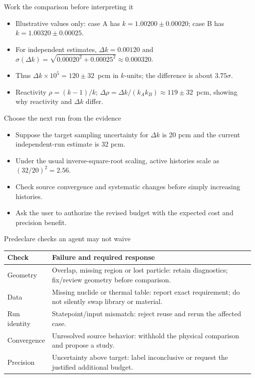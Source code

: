 \documentclass[aspectratio=169,11pt]{beamer}
\begin{document}
\begin{frame}[t,fragile]{Work the comparison before interpreting it}
\fontsize{11.5}{14}\selectfont
\begin{itemize}\setlength{\itemsep}{2mm}
\item Illustrative values only: case A has $k = 1.00200 \pm 0.00020$; case B has $k = 1.00320 \pm 0.00025$.
\item For independent estimates, $\Delta k = 0.00120$ and $\sigma(\Delta k) = \sqrt{0.00020^2 + 0.00025^2} \approx 0.000320$.
\item Thus $\Delta k \times 10^5 = 120 \pm 32$~pcm in $k$-units; the difference is about $3.75\sigma$.
\item Reactivity $\rho = (k-1)/k$; $\Delta \rho = \Delta k / (k_A k_B) \approx 119 \pm 32$~pcm, showing why reactivity and $\Delta k$ differ.
\end{itemize}
\end{frame}
\begin{frame}[t,fragile]{Choose the next run from the evidence}
\fontsize{11.5}{14}\selectfont
\begin{itemize}\setlength{\itemsep}{2mm}
\item Suppose the target sampling uncertainty for $\Delta k$ is 20 pcm and the current independent-run estimate is 32 pcm.
\item Under the usual inverse-square-root scaling, active histories scale as $(32/20)^2 = 2.56$.
\item Check source convergence and systematic changes before simply increasing histories.
\item Ask the user to authorize the revised budget with the expected cost and precision benefit.
\end{itemize}
\end{frame}
\begin{frame}[t,fragile]{Predeclare checks an agent may not waive}
\fontsize{10.5}{12.5}\selectfont\setlength{\tabcolsep}{4pt}\renewcommand{\arraystretch}{1.15}
\begin{tabular}{>{\raggedright\arraybackslash}p{}>{\raggedright\arraybackslash}p{}}
\toprule
\textbf{Check} & \textbf{Failure and required response} \\ \midrule
Geometry & Overlap, missing region or lost particle: retain diagnostics; fix/review geometry before comparison. \\[2pt]
Data & Missing nuclide or thermal table: report exact requirement; do not silently swap library or material. \\[2pt]
Run identity & Statepoint/input mismatch: reject reuse and rerun the affected case. \\[2pt]
Convergence & Unresolved source behavior: withhold the physical comparison and propose a study. \\[2pt]
Precision & Uncertainty above target: label inconclusive or request the justified additional budget. \\[2pt]
\bottomrule\end{tabular}\par\vspace{2mm}
\end{frame}
\end{document}
